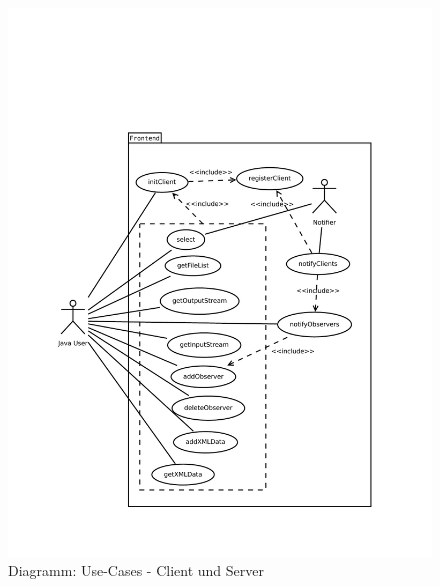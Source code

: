 \begin{figure}[!h]
	\centering
	\label{dia:design:frontend:usecase}
	\includegraphics[height=0.9\textheight]{design/frontend/usecase.pdf}
	\caption{Diagramm: Use-Cases - Client und Server}
\end{figure}

\newpage

